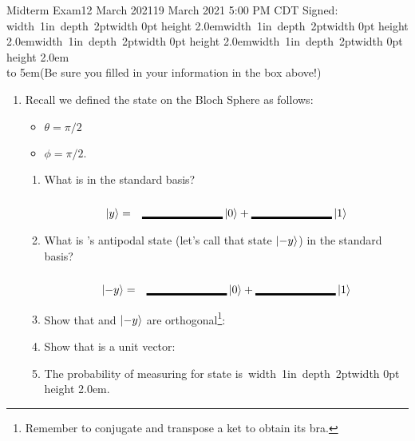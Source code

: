 \documentclass[12pt]{article}
\newcommand{\Blank}{\mbox{\vrule width 1in depth 2pt}\vrule width 0pt height 2.0em}
\begin{document}
\begin{assignment}{Midterm Exam}{12 March 2021}{19 March 2021 5:00 PM CDT}
Signed:  \Blank\Blank\Blank\Blank \\ \hbox to 5em{\hss}(Be 
sure you filled in your information in the box above!)
\clearpage
\begin{enumerate}
\item{} 
Recall we defined the state  on the Bloch Sphere as follows:
\begin{itemize}
\item
$\theta=\pi/2$ 
\item  $\phi=\pi/2$.
\end{itemize}
\begin{enumerate}
  \item{} What is  in the standard basis?
\begin{eqnarray*}
   \ket{y} & = & \Blank \ket{0} + \Blank \ket{1}
\end{eqnarray*}
  \item{}  What is 's antipodal state (let's call that
state $\left\vert{-y}\right\rangle$) in the standard
basis?
\begin{eqnarray*}
   \ket{-y} & = & \Blank \ket{0} + \Blank \ket{1}
\end{eqnarray*}
  \item{} Show that  and $\left\vert{-y}\right\rangle$ are orthogonal\footnote{%
Remember to conjugate and transpose a ket to obtain its bra.}:
\LeaveSpace{1in}
  \item{} Show that  is a unit vector:
\LeaveSpace{1in}
  \item{} The probability of measuring  for state  is~\Blank{}.
\end{enumerate}


\end{enumerate}
\end{assignment}
\end{document}
